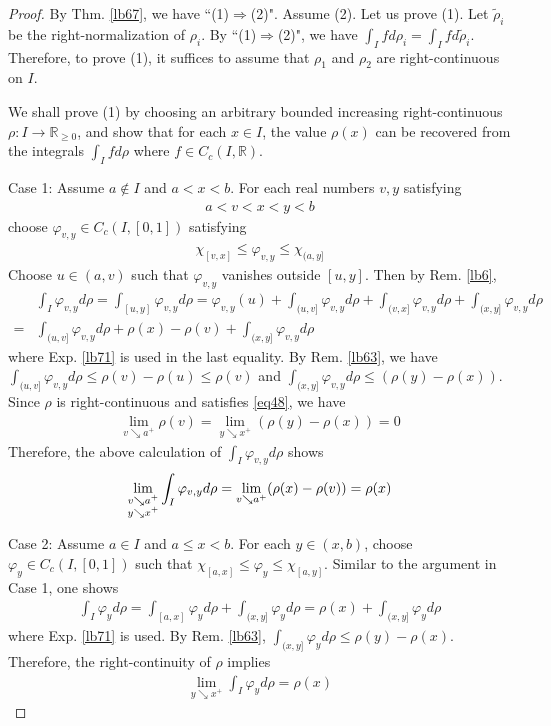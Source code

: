 \documentclass[12pt,b5paper,notitlepage]{article}
\theoremstyle{definition}
\theoremstyle{plain}
\newcommand{\wtd}{\widetilde}
\newcommand{\Rbb}{\mathbb R}
\numberwithin{equation}{section}
\begin{document}
\begin{proof}
By Thm. \ref{lb67}, we have ``(1)$\Rightarrow$(2)". Assume (2). Let us prove (1). Let $\wtd\rho_i$ be the right-normalization of $\rho_i$. By ``(1)$\Rightarrow$(2)", we have $\int_I fd\rho_i=\int_I fd\wtd\rho_i$. Therefore, to prove (1), it suffices to assume that $\rho_1$ and $\rho_2$ are right-continuous on $I$.

We shall prove (1) by choosing an arbitrary bounded increasing right-continuous $\rho:I\rightarrow\Rbb_{\geq0}$, and show that for each $x\in I$, the value $\rho(x)$ can be recovered from the integrals $\int_Ifd\rho$ where $f\in C_c(I,\Rbb)$.

Case 1: Assume $a\notin I$ and $a<x<b$. For each real numbers $v,y$ satisfying
\begin{align*}
a<v<x<y<b
\end{align*}
choose $\varphi_{v,y}\in C_c(I,[0,1])$ satisfying
\begin{align*}
\chi_{[v,x]}\leq\varphi_{v,y}\leq \chi_{(a,y]}
\end{align*}
Choose $u\in(a,v)$ such that $\varphi_{v,y}$ vanishes outside $[u,y]$. Then by Rem. \ref{lb6},
\begin{align*}
&\int_I\varphi_{v,y}d\rho=\int_{[u,y]}\varphi_{v,y}d\rho=\varphi_{v,y}(u)+\int_{(u,v]}\varphi_{v,y}d\rho+\int_{(v,x]}\varphi_{v,y}d\rho+\int_{(x,y]}\varphi_{v,y}d\rho\\
=&\int_{(u,v]}\varphi_{v,y}d\rho+\rho(x)-\rho(v)+\int_{(x,y]}\varphi_{v,y}d\rho
\end{align*}
where Exp. \ref{lb71} is used in the last equality. By Rem. \ref{lb63}, we have $\int_{(u,v]}\varphi_{v,y}d\rho\leq \rho(v)-\rho(u)\leq\rho(v)$ and $\int_{(x,y]}\varphi_{v,y}d\rho\leq (\rho(y)-\rho(x))$. Since $\rho$ is right-continuous and satisfies \eqref{eq48}, we have
\begin{align*}
\lim_{v\searrow a^+}\rho(v)=\lim_{y\searrow x^+}(\rho(y)-\rho(x))=0
\end{align*}
Therefore, the above calculation of $\int_I\varphi_{v,y}d\rho$ shows
\begin{align*}
\lim_{
\begin{subarray}{c}
v\searrow a^+\\
y\searrow x^+
\end{subarray}}
\int_I \varphi_{v,y}d\rho=\lim_{v\searrow a^+}(\rho(x)-\rho(v))=\rho(x)
\end{align*}



Case 2: Assume $a\in I$ and $a\leq x<b$. For each $y\in(x,b)$, choose $\varphi_y\in C_c(I,[0,1])$ such that $\chi_{[a,x]}\leq\varphi_y\leq\chi_{[a,y]}$. Similar to the argument in Case 1, one shows
\begin{align*}
\int_I\varphi_yd\rho=\int_{[a,x]}\varphi_yd\rho+\int_{(x,y]}\varphi_yd\rho=\rho(x)+\int_{(x,y]}\varphi_yd\rho
\end{align*}
where Exp. \ref{lb71} is used. By Rem. \ref{lb63}, $\int_{(x,y]}\varphi_yd\rho\leq \rho(y)-\rho(x)$. Therefore, the right-continuity of $\rho$ implies
\begin{align*}
\lim_{y\searrow x^+}\int_I \varphi_yd\rho=\rho(x)
\end{align*}



\end{proof}
\end{document}
